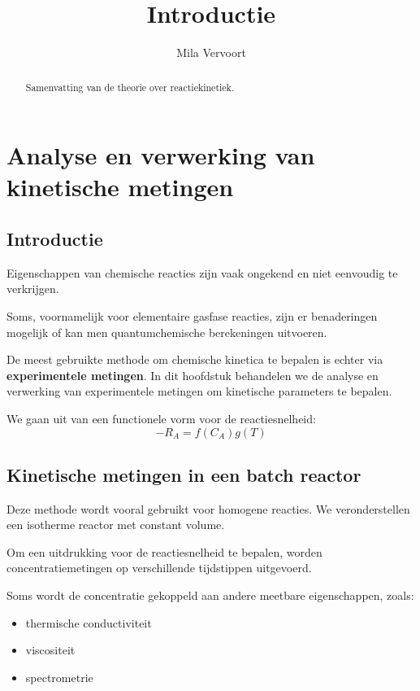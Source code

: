 \documentclass{ximera}
\title{Introductie}
\author{Mila Vervoort}
\begin{document}
\begin{abstract}
    Samenvatting van de theorie over reactiekinetiek.
\end{abstract}
\maketitle
\label{xim:Introductie analysemethode}

\section*{Analyse en verwerking van kinetische metingen}

\subsection*{Introductie}

Eigenschappen van chemische reacties zijn vaak ongekend en niet eenvoudig te verkrijgen.

Soms, voornamelijk voor elementaire gasfase reacties, zijn er benaderingen mogelijk
of kan men quantumchemische berekeningen uitvoeren.

De meest gebruikte methode om chemische kinetica te bepalen is echter via
\textbf{experimentele metingen}. In dit hoofdstuk behandelen we de analyse
en verwerking van experimentele metingen om kinetische parameters te bepalen.

We gaan uit van een functionele vorm voor de reactiesnelheid:
\[-R_A = f(C_A)g(T)
\]

\subsection*{Kinetische metingen in een batch reactor}

Deze methode wordt vooral gebruikt voor homogene reacties. We veronderstellen een
isotherme reactor met constant volume.

Om een uitdrukking voor de reactiesnelheid te bepalen, worden concentratiemetingen op verschillende tijdstippen uitgevoerd.

Soms wordt de concentratie gekoppeld aan andere meetbare eigenschappen, zoals:

\begin{itemize}
\item thermische conductiviteit
\item viscositeit
\item spectrometrie
\end{itemize}
\end{document}
